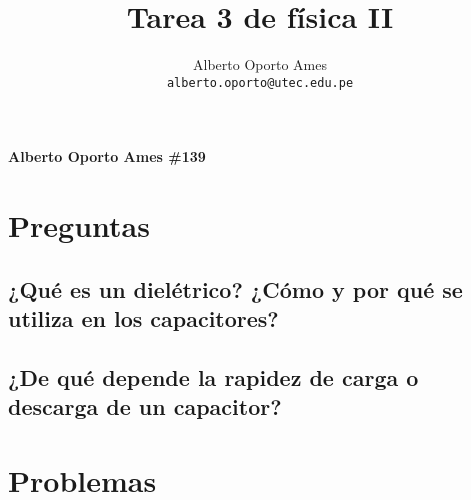 \documentclass[10pt, twoside]{article}
\title{\textbf{Tarea 3 de física II}}
\author{
		Alberto Oporto Ames\\
		\texttt{alberto.oporto@utec.edu.pe}\\
		}
\begin{document}
\thispagestyle{fancy}

\textbf{Alberto Oporto Ames \#139}

\section*{Preguntas}%

\subsection*{¿Qué es un dielétrico?
¿Cómo y por qué se utiliza en los capacitores?}%

\subsection*{¿De qué depende la rapidez de carga o descarga de un capacitor?}%

\section*{Problemas}%
\end{document}
